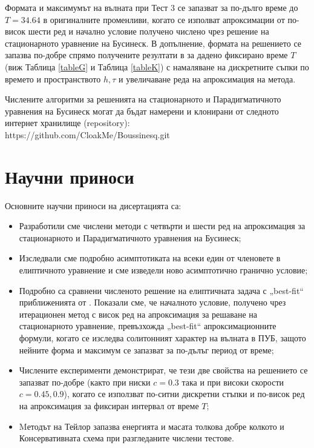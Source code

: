 \documentclass[a5paper]{article}
\theoremstyle{remark}
\begin{document}
\begin{large}
Формата и максимумът на вълната при Тест 3 се запазват за по-дълго време до $T=34.64$ в оригиналните променливи, когато се изполват апроксимации от по-висок шести ред и начално условие получено числено чрез решение на стационарното уравнение на Бусинеск. В допълнение, формата на решението се запазва по-добре спрямо получените резултати в \cite{ref21, ref20, ref23, ref22, ref24} за дадено фиксирано време $T$ (виж Таблица \ref{tableG} и Таблица \ref{tableK}) с намаляване на дискретните съпки по времето и пространството $h, \tau$ и увеличаване реда на апроксимация на метода.

Числените алгоритми за решенията на стационарното и Парадигматичното уравнения на Бусинеск могат да бъдат намерени и клонирани от следното интернет хранилище (repository):\\
https://github.com/CloakMe/Boussinesq.git

\section{Научни приноси}

Основните научни приноси на дисертацията са:
\begin{itemize}
  \item Разработили сме числени методи с четвърти и шести ред на апроксимация за стационарното и Парадигматичното уравнения на Бусинеск;
  \item Изследвали сме подробно асимптотиката на всеки един от членовете в елиптичното уравнение и сме изведели ново асимптотично гранично условие; 
  \item Подробно са сравнени численото решение на елиптичната задача с „best-fit“ приближенията от \cite{ref15}. Показали сме, че началното условие, получено чрез итерационен метод с висок ред на апроксимация за решаване на стационарното уравнение, превъзхожда „best-fit“ апроксимационните формули, когато се изследва солитонният характер на вълната в ПУБ, защото нейните форма и максимум се запазват за по-дълъг период от време; 
  \item Числените експерименти демонстрират, че тези две свойства на решението се запазват по-добре (както при ниски $c=0.3$ така и при високи скорости $c=0.45,0.9$), когато се използват по-ситни дискретни стъпки и по-висок ред на апроксимация за фиксиран интервал от време $T$;
  \item Mетодът на Тейлор запазва енергията и масата толкова добре колкото и Консервативната схема при разгледаните числени тестове.
\end{itemize}


\end{large}
\end{document}

